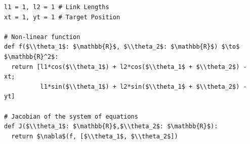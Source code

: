 \documentclass[border=10pt]{standalone}
\begin{document}
\begin{lstlisting}
l1 = 1, l2 = 1 # Link Lengths
xt = 1, yt = 1 # Target Position

# Non-linear function
def f($\\theta_1$: $\mathbb{R}$, $\\theta_2$: $\mathbb{R}$) $\to$ $\mathbb{R}^2$:
  return [l1*cos($\\theta_1$) + l2*cos($\\theta_1$ + $\\theta_2$) - xt; 
          l1*sin($\\theta_1$) + l2*sin($\\theta_1$ + $\\theta_2$) - yt]

# Jacobian of the system of equations
def J($\\theta_1$: $\mathbb{R}$,$\\theta_2$: $\mathbb{R}$):
  return $\nabla$(f, [$\\theta_1$, $\\theta_2$])
\end{lstlisting}
\end{document}

